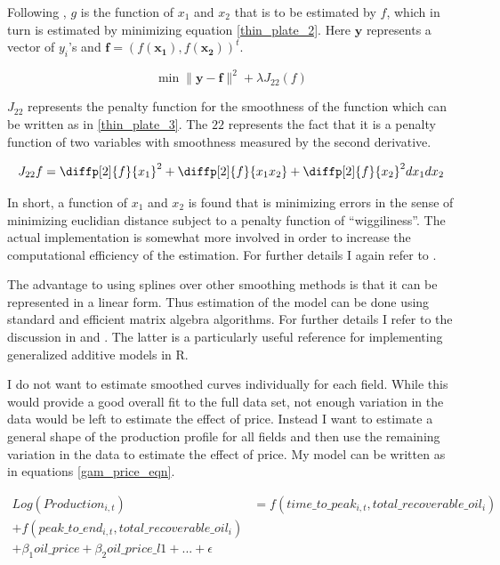 \documentclass[12pt]{article}
\begin{document}
Following \citet{wood_generalized_2006}, $g$ is the function of $x_1$ and $x_2$ that is to be estimated by $f$, which in turn is estimated by minimizing equation \ref{thin_plate_2}.  Here $\boldsymbol{y}$ represents a vector of $y_i$’s and $\boldsymbol{f} = (f(\boldsymbol{x_1}),f(\boldsymbol{x_2}))^t$.   

	\begin{equation}
\min \|\boldsymbol{y-f}\|^2 + \lambda J_{22}(f)
\label{thin_plate_2}
	\end{equation}

$J_{22}$ represents the penalty function for the smoothness of the function which can be written as in \ref{thin_plate_3}.  The $22$ represents the fact that it is a penalty function of two variables with smoothness measured by the second derivative.

	\begin{equation}
	J_{22}{f}= \diffp[2]{f}{x_1}^2 + \diffp[2]{f}{{x_1}{x_2}} + \diffp[2]{f}{x_2}^2dx_1 dx_2
\label{thin_plate_3}
	\end{equation}

In short, a function of $x_1$ and $x_2$ is found that is minimizing errors in the sense of minimizing euclidian distance subject to a penalty function of “wiggiliness”.  The actual implementation is somewhat more involved in order to increase the computational efficiency of the estimation.  For further details I again refer to \citet{wood_thin_2003}.

The advantage to using splines over other smoothing methods is that it can be represented in a linear form.  Thus estimation of the model can be done using standard and efficient matrix algebra algorithms. For further details I refer to the discussion in \citet{hastie_generalized_1990} and \citet{wood_generalized_2006}.  The latter is a particularly useful reference for implementing generalized additive models in R.

I do not want to estimate smoothed curves individually for each field.  While this would provide a good overall fit to the full data set, not enough variation in the data would be left to estimate the effect of price.  Instead I want to estimate a general shape of the production profile for all fields and then use the remaining variation in the data to estimate the effect of price.  My model can be written as in equations \ref{gam_price_eqn}.

\begin{multline}
	Log(Production_{i,t})&=f(time\_to\_peak_{i,t}, total\_recoverable\_oil_i) \\
 	+ f(peak\_to\_end_{i,t}, total\_recoverable\_oil_i) \\
	+ \beta_1 oil\_price + \beta_2 oil\_price\_l1 + ... +  \epsilon
\label{gam_price_eqn}
\end{multline}
\end{document}
